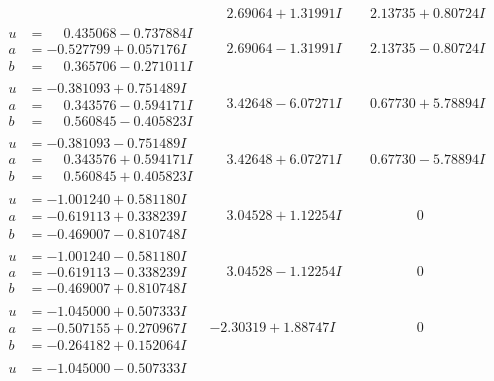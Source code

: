 \documentclass[1p]{elsarticle_modified}
\theoremstyle{definition}
\begin{document}
$$\begin{array}{c|c|c}
 & \phantom{-}2.69064 + 1.31991 I & \phantom{-}2.13735 + 0.80724 I \\ \hline\begin{aligned}
u &= \phantom{-}0.435068 - 0.737884 I \\
a &= -0.527799 + 0.057176 I \\
b &= \phantom{-}0.365706 - 0.271011 I\end{aligned}
 & \phantom{-}2.69064 - 1.31991 I & \phantom{-}2.13735 - 0.80724 I \\ \hline\begin{aligned}
u &= -0.381093 + 0.751489 I \\
a &= \phantom{-}0.343576 - 0.594171 I \\
b &= \phantom{-}0.560845 - 0.405823 I\end{aligned}
 & \phantom{-}3.42648 - 6.07271 I & \phantom{-}0.67730 + 5.78894 I \\ \hline\begin{aligned}
u &= -0.381093 - 0.751489 I \\
a &= \phantom{-}0.343576 + 0.594171 I \\
b &= \phantom{-}0.560845 + 0.405823 I\end{aligned}
 & \phantom{-}3.42648 + 6.07271 I & \phantom{-}0.67730 - 5.78894 I \\ \hline\begin{aligned}
u &= -1.001240 + 0.581180 I \\
a &= -0.619113 + 0.338239 I \\
b &= -0.469007 - 0.810748 I\end{aligned}
 & \phantom{-}3.04528 + 1.12254 I & \phantom{-0.000000 } 0 \\ \hline\begin{aligned}
u &= -1.001240 - 0.581180 I \\
a &= -0.619113 - 0.338239 I \\
b &= -0.469007 + 0.810748 I\end{aligned}
 & \phantom{-}3.04528 - 1.12254 I & \phantom{-0.000000 } 0 \\ \hline\begin{aligned}
u &= -1.045000 + 0.507333 I \\
a &= -0.507155 + 0.270967 I \\
b &= -0.264182 + 0.152064 I\end{aligned}
 & -2.30319 + 1.88747 I & \phantom{-0.000000 } 0 \\ \hline\begin{aligned}
u &= -1.045000 - 0.507333 I \\

\end{aligned}
\end{array}$$
\end{document}
